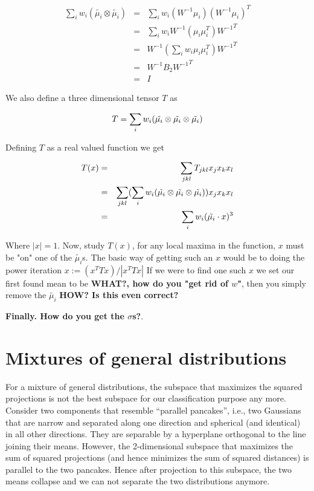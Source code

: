 \documentclass{book}
\numberwithin{exercise}{chapter}
\begin{document}
\begin{eqnarray*}
  \sum_i w_i (\tilde{\mu_i} \otimes \tilde{\mu_i})
  &=& \sum_i w_i (W^{-1} \mu_i)(W^{-1} \mu_i)^T \\
  &=& \sum_i w_i W^{-1} (\mu_i \mu_i^T) {W^{-1}}^T \\
  &=& W^{-1} (\sum_i w_i \mu_i \mu_i^T) {W^{-1}}^T \\
  &=& W^{-1} B_2 {W^{-1}}^T \\
  &=& I
\end{eqnarray*}

We also define a three dimensional tensor $T$ as

\[
  T = \sum_i w_i ( \tilde{\mu_i}  \otimes  \tilde{\mu_i}  \otimes  \tilde{\mu_i} )
\]

Defining $T$ as a real valued function we get

\begin{eqnarray*}
  T(x)
  &=& \sum_{jkl} T_{jkl} x_j x_k x_l \\
  &=& \sum_{jkl} (\sum_i w_i ( \tilde{\mu_i}  \otimes  \tilde{\mu_i}  \otimes  \tilde{\mu_i} )) x_j x_k x_l \\
  &=& \sum_i w_i (\tilde{\mu_i} \cdot x)^3
\end{eqnarray*}

Where $|x| = 1$. Now, study $T(x)$, for any local maxima in the function, $x$
must be "on" one of the $\tilde{\mu_i}$s. The basic way of getting such
an $x$ would be to doing the power iteration $x := (x^T T x)/|x^T T x|$ If we were to find one such $x$ we
set our first found mean to be \textbf{WHAT?, how do you "get rid of $w$"}, then
you simply remove the $\tilde{\mu_i}$ \textbf{HOW? Is this even correct?}

\textbf{Finally. How do you get the $\sigma$s?}.

\section{Mixtures of general distributions}\label{sec:genmix}
For a mixture of general distributions, the subspace that maximizes the squared projections is not the best subspace for our classification purpose any more. Consider two components that resemble ``parallel pancakes'', i.e., two Gaussians that are narrow and separated along one direction and spherical (and identical) in all other directions. They are separable by a hyperplane orthogonal to the line joining their means. However, the 2-dimensional subspace that maximizes the sum of squared projections (and hence minimizes the sum of squared distances)
is parallel to the two pancakes. Hence after projection to this subspace, the two means collapse and we can not separate
the two distributions anymore.
\end{document}
